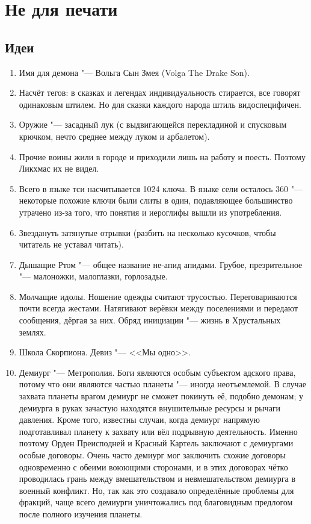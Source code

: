 \chapter{Не для печати}

\section{Идеи}

\begin{enumerate}

\item Имя для демона "--- Вольга Сын Змея (Volga The Drake Son).

\item Насчёт тегов: в сказках и легендах индивидуальность стирается, все говорят одинаковым штилем.
Но для сказки каждого народа штиль видоспецифичен.

\item Оружие "--- засадный лук (с выдвигающейся перекладиной и спусковым крючком, нечто среднее между луком и арбалетом).

\item Прочие воины жили в городе и приходили лишь на работу и поесть.
Поэтому Ликхмас их не видел.

\item Всего в языке тси насчитывается 1024 ключа.
В языке сели осталось 360 "--- некоторые похожие ключи были слиты в один, подавляющее большинство утрачено из-за того, что понятия и иероглифы вышли из употребления.

\item Звездануть затянутые отрывки (разбить на несколько кусочков, чтобы читатель не уставал читать).

\item Дышащие Ртом "--- общее название не-апид апидами.
Грубое, презрительное "--- малоножки, малоглазки, горлозадые.

\item Молчащие идолы.
Ношение одежды считают трусостью.
Переговариваются почти всегда жестами.
Натягивают верёвки между поселениями и передают сообщения, дёргая за них.
Обряд инициации "--- жизнь в Хрустальных землях.

\item Школа Скорпиона.
Девиз "--- <<Мы одно>>.

\item Демиург "--- Метрополия.
Боги являются особым субъектом адского права, потому что они являются частью планеты "--- иногда неотъемлемой.
В случае захвата планеты врагом демиург не сможет покинуть её, подобно демонам;
у демиурга в руках зачастую находятся внушительные ресурсы и рычаги давления.
Кроме того, известны случаи, когда демиург напрямую подготавливал планету к захвату или вёл подрывную деятельность.
Именно поэтому Орден Преисподней и Красный Картель заключают с демиургами особые договоры.
Очень часто демиург мог заключить схожие договоры одновременно с обеими воюющими сторонами, и в этих договорах чётко проводилась грань между вмешательством и невмешательством демиурга в военный конфликт.
Но, так как это создавало определённые проблемы для фракций, чаще всего демиурги уничтожались под благовидным предлогом после полного изучения планеты.


\end{enumerate}
